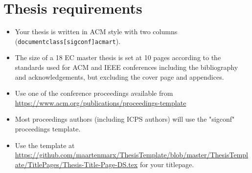 \documentclass[sigconf,format=acmsmall, screen=true, review=false]{acmart}
\begin{document}


\pagebreak


\pagebreak

\begin{abstract}
\end{abstract}


\section*{Thesis requirements}
\begin{itemize}
\item Your thesis is written in ACM style with two columns  (\texttt{documentclass[sigconf]{acmart}}).
\item   The	size	 of	a	18	EC master	thesis	is	set	at	10	pages	according	to	the	standards	used	for	ACM	and	IEEE	 conferences	 including	 the	 bibliography and	 acknowledgements,	 but excluding	 the	 cover	 page and	appendices.
\item Use one of the conference proceedings available from \url{https://www.acm.org/publications/proceedings-template}
\item Most proceedings authors (including ICPS authors) will use the "sigconf" proceedings template.
\item Use the template at \url{https://github.com/maartenmarx/ThesisTemplate/blob/master/ThesisTemplate/TitlePages/Thesis-Title-Page-DS.tex} for your titlepage.
\end{itemize}


\pagebreak













\appendix

%
 
\end{document}
